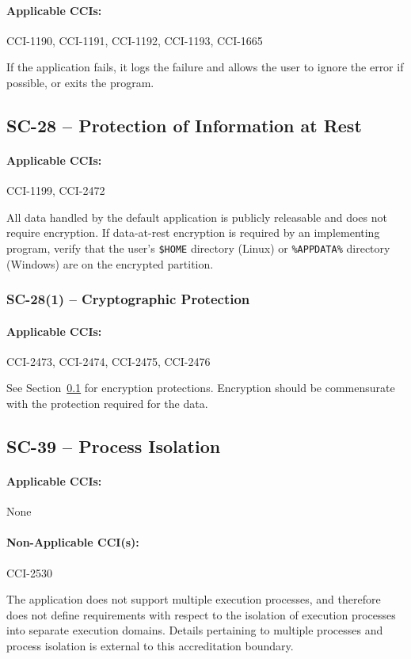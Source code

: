\documentclass[letterpaper, 10pt, twoside]{article}
\begin{document}
\paragraph{Applicable CCIs:} CCI-1190, CCI-1191, CCI-1192, CCI-1193, CCI-1665

If the application fails, it logs the failure and allows the user to ignore the error if possible, or exits the program.

\subsection{SC-28 -- Protection of Information at Rest}
\label{sec:sc-28}

\paragraph{Applicable CCIs:} CCI-1199, CCI-2472

All data handled by the default application is publicly releasable and does not require encryption. If data-at-rest encryption is required by an implementing program, verify that the user's \texttt{\$HOME} directory (Linux) or \texttt{\%APPDATA\%} directory (Windows) are on the encrypted partition.

\subsubsection{SC-28(1) -- Cryptographic Protection}

\paragraph{Applicable CCIs:} CCI-2473, CCI-2474, CCI-2475, CCI-2476

See Section~\ref{sec:sc-28} for encryption protections. Encryption should be commensurate with the protection required for the data.

\subsection{SC-39 -- Process Isolation}

\paragraph{Applicable CCIs:} None

\paragraph{Non-Applicable CCI(s):} CCI-2530

The application does not support multiple execution processes, and therefore does not define requirements with respect to the isolation of execution processes into separate execution domains. Details pertaining to multiple processes and process isolation is external to this accreditation boundary.

\clearpage
\printbibliography
\end{document}
